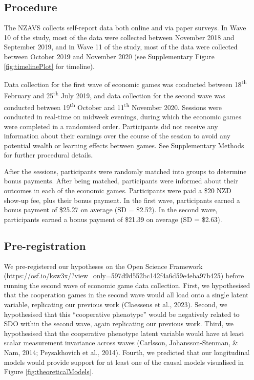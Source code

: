 \documentclass[
  man,floatsintext]{apa6}
\begin{document}
\hypertarget{procedure}{%
\subsection{Procedure}\label{procedure}}

The NZAVS collects self-report data both online and via paper surveys. In Wave
10 of the study, most of the data were collected between November 2018 and
September 2019, and in Wave 11 of the study, most of the data were collected
between October 2019 and November 2020 (see Supplementary Figure
\ref{fig:timelinePlot} for timeline).

Data collection for the first wave of economic games was conducted between
18\textsuperscript{th} February and 25\textsuperscript{th} July 2019, and data collection for the second wave
was conducted between 19\textsuperscript{th} October and 11\textsuperscript{th} November 2020. Sessions were
conducted in real-time on midweek evenings, during which the economic games were
completed in a randomised order. Participants did not receive any information
about their earnings over the course of the session to avoid any potential
wealth or learning effects between games. See Supplementary Methods for further
procedural details.

After the sessions, participants were randomly matched into groups to determine
bonus payments. After being matched, participants were informed about their
outcomes in each of the economic games. Participants were paid a \$20 NZD
show-up fee, plus their bonus payment. In the first wave, participants earned a
bonus payment of \$25.27 on average (SD =
\$2.52). In the second wave, participants
earned a bonus payment of \$21.39 on
average (SD = \$2.63).

\hypertarget{pre-registration}{%
\subsection{Pre-registration}\label{pre-registration}}

We pre-registered our hypotheses on the Open Science Framework
(\url{https://osf.io/ksw3x/?view_only=597d9d552bc142f4a6d59e4eba97b425}) before
running the second wave of economic game data collection. First, we
hypothesised that the cooperation games in the second wave would all load onto
a single latent variable, replicating our previous work (Claessens et al., 2023).
Second, we hypothesised that this ``cooperative phenotype'' would be negatively
related to SDO within the second wave, again replicating our previous work.
Third, we hypothesised that the cooperative phenotype latent variable would
have at least scalar measurement invariance across waves (Carlsson, Johansson-Stenman, \& Nam, 2014; Peysakhovich et al., 2014). Fourth, we predicted that our longitudinal models would
provide support for at least one of the causal models visualised in Figure
\ref{fig:theoreticalModels}.
\end{document}
